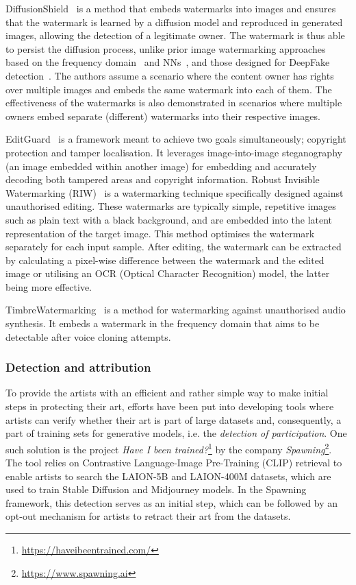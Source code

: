 \documentclass[conference,table]{IEEEtran}
\begin{document}
DiffusionShield~\cite{cui_diffusionshield_2023} is a method that embeds watermarks into images and ensures that the watermark is learned by a diffusion model and reproduced in generated images, allowing the detection of a legitimate owner.
The watermark is thus able to persist the diffusion process, unlike prior image watermarking approaches based on the frequency domain~\cite{navas_dwt-dct-svd_2008} and NNs~\cite{zhu_hidden_2018}, and those designed for DeepFake detection~\cite{yu_artificial_2021}.
The authors assume a scenario where the content owner has rights over multiple images and embeds the same watermark into each of them. 
The effectiveness of the watermarks is also demonstrated in scenarios where multiple owners embed separate (different) watermarks into their respective images. 

EditGuard~\cite{zhang_editguard_2023} is a framework meant to achieve two goals simultaneously; copyright protection and tamper localisation. 
It leverages image-into-image steganography (an image embedded within another image) for embedding and accurately decoding both tampered areas and copyright information. 
Robust Invisible Watermarking (RIW)~\cite{tan_somewhat_2023} is a watermarking technique specifically designed against unauthorised editing. 
These watermarks are typically simple, repetitive images such as plain text with a black background, and are embedded into the latent representation of the target image. 
This method optimises the watermark separately for each input sample. 
After editing, the watermark can be extracted by calculating a pixel-wise difference between the watermark and the edited image or utilising an OCR (Optical Character Recognition) model, the latter being more effective.

TimbreWatermarking~\cite{liu_detecting_2024} is a method for watermarking against unauthorised audio synthesis. 
It embeds a watermark in the frequency domain that aims to be detectable after voice cloning attempts.


\subsubsection{Detection and attribution}\label{sec:mitigation-detection}

To provide the artists with an efficient and rather simple way to make initial steps in protecting their art, efforts have been put into developing tools where artists can verify whether their art is part of large datasets and, consequently, a part of training sets for generative models, i.e. the \textit{detection of participation}. 
One such solution is the project \textit{Have I been trained?}\footnote{\url{https://haveibeentrained.com/}} by the company \textit{Spawning}\footnote{\url{https://www.spawning.ai}}. 
The tool relies on Contrastive Language-Image Pre-Training (CLIP) retrieval to enable artists to search the LAION-5B and LAION-400M datasets, which are used to train Stable Diffusion and Midjourney models. 
In the Spawning framework, this detection serves as an initial step, which can be followed by an opt-out mechanism for artists to retract their art from the datasets. 
\end{document}
